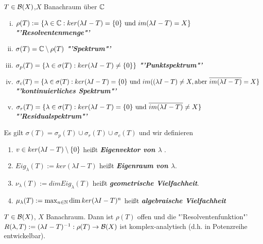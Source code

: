 	\begin{definition}
	\label{def:5.9}
		$T\in \BS[X]$,$X$ Banachraum über $\mathbb{C}$
		\begin{enumerate}[(i)]
		  \item%
				$\rho(T) := \{\lambda \in \mathbb{C}: ker(\lambda I -T) = \{0\} \text{ und }
				im(\lambda I- T) = X\}$%
				\hfill \textbf{\textit{"'Resolventenmenge"'}}%
			\item%
				$\sigma(T) = \mathbb{C} \setminus \rho(T)$%
				\hfill \textbf{\textit{"'Spektrum"'}}
			\item%
				$\sigma_p(T) = \{\lambda \in \sigma(T):
				ker(\lambda I - T) \neq \{0\}
				\}$%
				\hfill \textbf{\textit{"'Punktspektrum"'}}
			\item%
				$\sigma_c(T) = \{\lambda \in \sigma(T):
				ker(\lambda I - T) =  \{0\} \text{ und }
				im((\lambda I - T)\neq X, \text{aber }
				\overline{im(\lambda I - T)} = X\}$%
				\hfill \textbf{\textit{"'kontinuierliches Spektrum"'}}
			\item%
				$\sigma_r(T) = \{\lambda \in \sigma(T):
				ker(\lambda I - T) = \{0\} \text{ und }
				\overline{im(\lambda I - T)} \neq X\}$%
				\hfill \textbf{\textit{"'Residualspektrum"'}}
		\end{enumerate}
	Es gilt $ \sigma(T) = \sigma_p(T) \cup \sigma_r(T) \cup \sigma_c(T)$
	 und wir definieren
	 \begin{enumerate}[(1)]
	   \item	$v\in ker(\lambda I - T) \setminus \{0\}$ heißt \textbf{\textit{ Eigenvektor von $\lambda$ }}.
		 \item $Eig_\lambda(T) := ker(\lambda I - T)$ heißt \textbf{\textit{Eigenraum von $\lambda$}}.
		 \item $\nu_\lambda(T) := dim Eig_\lambda(T)$ heißt \textbf{\textit{geometrische Vielfachheit}}.
		 \item $\mu_\lambda(T) := \max_{n\in\mathbb{N}} \dim ker(\lambda I - T)^n$ heißt
		 	\textbf{\textit{ algebraische Vielfachheit}}
	 \end{enumerate}
	
	\end{definition}

	\begin{thm}
	\label{thm:5.10}
		$T\in \BS[X]$, $X$ Banachraum. Dann ist $\rho(T)$ offen und die "'Resolventenfunktion"' 
			$ R(\lambda, T) := \inv{(\lambda I - T)} : \rho(T) \to \BS[X] $ 
		ist komplex-analytisch (d.h. in Potenzreihe entwickelbar).
	\end{thm}

